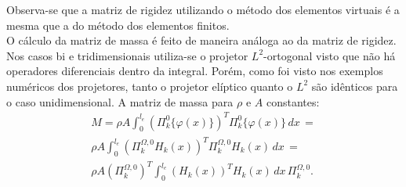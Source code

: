 \indent Observa-se que a matriz de rigidez utilizando o método dos elementos virtuais é a mesma que a do método dos elementos finitos. \\
\indent O cálculo da matriz de massa é feito de maneira análoga ao da matriz de rigidez. Nos casos bi e tridimensionais utiliza-se o projetor $L^2$-ortogonal visto que não há operadores diferenciais dentro da integral. Porém, como foi visto nos exemplos numéricos dos projetores, tanto o projetor elíptico quanto o $L^2$ são idênticos para o caso unidimensional. A matriz de massa para $\rho$ e $A$ constantes:
\begin{equation}
    \begin{split}
        M = \rho A \int_{0}^{l_e} \left(\Pi_{k}^{0}\{\varphi(x)\}\right)^T \Pi_{k}^{0}\{\varphi(x)\} \, dx \, = \\
        \rho A \int_{0}^{l_e} \left(\Pi_{k}^{\Omega,0} H_k(x)\right)^T \Pi_{k}^{\Omega,0}H_k(x) \, dx \, = \\
        \rho A  \left(\Pi_{k}^{\Omega,0}\right)^T \int_{0}^{l_e} \left(H_k(x)\right)^T H_k(x) \, dx \,\Pi_{k}^{\Omega,0}.
    \end{split}
\end{equation}

